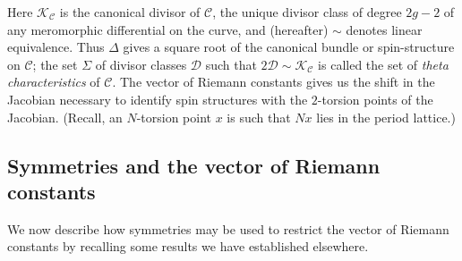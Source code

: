 \documentclass[pdftex]{sigma}
\numberwithin{equation}{section}
\begin{document}
Here $\mathcal{K}_\mathcal{C}$ is the canonical divisor of
$\mathcal{C}$, the unique divisor class of degree $2g-2$ of any
meromorphic dif\/ferential on the curve, and (hereafter) $\sim$ denotes linear
equivalence.
Thus $\Delta$ gives a square root of the canonical
bundle or spin-structure on $\mathcal{C}$; the set $\Sigma$ of
divisor classes $\mathcal{D}$ such that
$2\mathcal{D}\sim\mathcal{K}_\mathcal{C}$ is called the set of
\emph{theta characteristics} of $\mathcal{C}$. The vector of Riemann constants
gives us the shift in the Jacobian necessary to identify spin structures
with the $2$-torsion points of the Jacobian. (Recall, an $N$-torsion point $x$ is such
that $Nx$ lies in the period lattice.)

\subsection{Symmetries and the vector of Riemann constants}\label{section5.2}

We now describe how symmetries may be used to restrict the vector
of Riemann constants by recalling some results we have established elsewhere.
\end{document}
